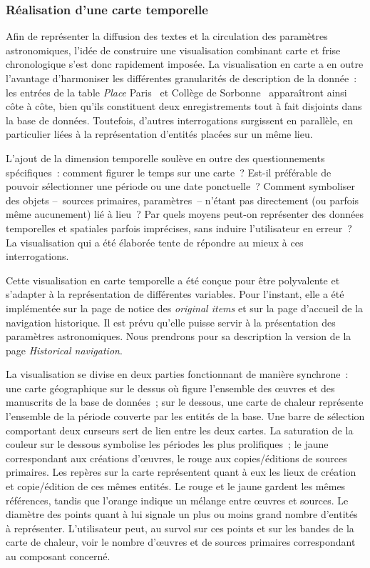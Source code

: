 \documentclass[a4paper,12pt,twoside]{book}
\newcommand{\eng}{\emph}
\newcommand{\ois}{\eng{original items}\xspace}
\newcommand{\bdd}{base de données\xspace}
\newcommand{\g}[1]{\og#1~\fg}
\begin{document}
			\subsubsection{Réalisation d'une carte temporelle}
Afin de représenter la diffusion des textes et la circulation des paramètres astronomiques, l'idée de construire une visualisation combinant carte et frise chronologique s'est donc rapidement imposée. La visualisation en carte a en outre l'avantage d'harmoniser les différentes granularités de description de la donnée~: les entrées de la table \eng{Place} \g{Paris} et \g{Collège de Sorbonne} apparaîtront ainsi côte à côte, bien qu'ils constituent deux enregistrements tout à fait disjoints dans la \bdd. Toutefois, d'autres interrogations surgissent en parallèle, en particulier liées à la représentation d'entités placées sur un même lieu.

L'ajout de la dimension temporelle soulève en outre des questionnements spécifiques~: comment figurer le temps sur une carte~? Est-il préférable de pouvoir sélectionner une période ou une date ponctuelle~? Comment symboliser des objets –~sources primaires, paramètres~– n'étant pas directement (ou parfois même aucunement) lié à lieu~? Par quels moyens peut-on représenter des données temporelles et spatiales parfois imprécises, sans induire l'utilisateur en erreur~? La visualisation qui a été élaborée tente de répondre au mieux à ces interrogations.

Cette visualisation en carte temporelle a été conçue pour être polyvalente et s'adapter à la représentation de différentes variables. Pour l'instant, elle a été implémentée sur la page de notice des \ois et sur la page d'accueil de la navigation historique. Il est prévu qu'elle puisse servir à la présentation des paramètres astronomiques. Nous prendrons pour sa description la version de la page \eng{Historical navigation}.

La visualisation se divise en deux parties fonctionnant de manière synchrone~: une carte géographique sur le dessus où figure l'ensemble des œuvres et des manuscrits de la \bdd~; sur le dessous, une carte de chaleur représente l'ensemble de la période couverte par les entités de la base. Une barre de sélection comportant deux curseurs sert de lien entre les deux cartes. La saturation de la couleur sur le dessous symbolise les périodes les plus prolifiques~; le jaune correspondant aux créations d'œuvres, le rouge aux copies/éditions de sources primaires. Les repères sur la carte représentent quant à eux les lieux de création et copie/édition de ces mêmes entités. Le rouge et le jaune gardent les mêmes références, tandis que l'orange indique un mélange entre œuvres et sources. Le diamètre des points quant à lui signale un plus ou moins grand nombre d'entités à représenter. L'utilisateur peut, au survol sur ces points et sur les bandes de la carte de chaleur, voir le nombre d'œuvres et de sources primaires correspondant au composant concerné.
\end{document}
